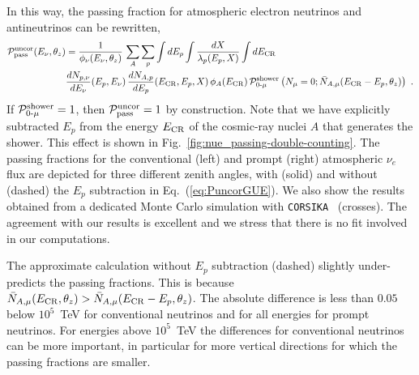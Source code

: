 \documentclass[aps,prd,showpacs,letterpaper,onecolumn,longbibliography,superscriptaddress,notitlepage,nofootinbib]{revtex4-1}%
\newcommand{\ECR}{E_{\rm CR}}
\newcommand{\Prob}{{\cal P}}
\newcommand{\Ppuncor}{\Prob_{\rm pass}^{\rm uncor}}
\newcommand{\Pzmproto}{\Prob_{0\text{-}\mu}^{\rm shower}}
\newcommand{\CORSIKA}{\texttt{CORSIKA}}
\begin{document}
In this way, the passing fraction for atmospheric electron neutrinos and antineutrinos can be rewritten,
%
\begin{align}
\label{eq:PuncorGUE}
\Ppuncor (E_\nu, \theta_z) & = \frac{1}{\phi_\nu(E_\nu, \theta_z)} \, \sum_A \sum_{p} \int dE_p \int \frac{dX}{\lambda_p(E_p, X)} \int d\ECR \nonumber \\
& \frac{dN_{p, \nu}}{dE_\nu}(E_p, E_\nu) \, \frac{dN_{A, p}}{dE_p}(\ECR, E_p, X) \, \phi_A(\ECR) \, \Pzmproto \left(N_\mu = 0  ; \bar N_{A, \mu}(\ECR - E_p, \theta_z)\right) ~.
\end{align}
%
If $\Pzmproto = 1$, then $\Ppuncor = 1$ by construction. Note that we have explicitly subtracted $E_p$ from the energy $\ECR$ of the cosmic-ray nuclei $A$ that generates the shower. This effect is shown in Fig.~\ref{fig:nue_passing-double-counting}. The passing fractions for the conventional (left) and prompt (right) atmospheric $\nu_e$ flux are depicted for three different zenith angles, with (solid) and without (dashed) the $E_p$ subtraction in Eq.~(\ref{eq:PuncorGUE}). We also show the results obtained from a dedicated Monte Carlo simulation with \CORSIKA~\cite{Heck:1998vt, Heck:2018} (crosses). The agreement with our results is excellent and we stress that there is no fit involved in our computations. 

The approximate calculation without $E_p$ subtraction (dashed) slightly under-predicts the passing fractions. This is because $\bar N_{A, \mu}(\ECR, \theta_z) > \bar N_{A, \mu}(\ECR - E_p, \theta_z)$. The absolute difference is less than $0.05$ below $10^5$~TeV for conventional neutrinos and for all energies for prompt neutrinos. For energies above $10^5$~TeV the differences for conventional neutrinos can be more important, in particular for more vertical directions for which the passing fractions are smaller.
\end{document}
